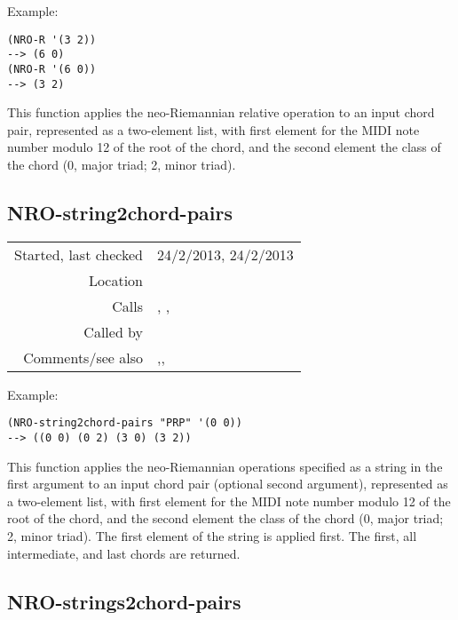 \vspace{0.5cm}
\noindent Example:
\begin{verbatim}
(NRO-R '(3 2))
--> (6 0)
(NRO-R '(6 0))
--> (3 2)
\end{verbatim}

\noindent This function applies the neo-Riemannian
relative operation to an input chord pair, represented
as a two-element list, with first element for the MIDI
note number modulo 12 of the root of the chord, and
the second element the class of the chord (0, major
triad; 2, minor triad).


\subsection*{NRO-string2chord-pairs}\label{fun:NRO-string2chord-pairs}

\vspace{0.3cm}
\begin{tabular}{r|p{8cm}}
Started, last checked & 24/2/2013, 24/2/2013 \\
Location & \nameref{sec:NRO} \\
Calls & \nameref{fun:NRO-L}, \nameref{fun:NRO-P}, \nameref{fun:NRO-R} \\
Called by & \nameref{fun:NRO-strings2chord-pairs} \\
Comments/see also & \nameref{fun:chord-pair2NRO-string},\newline \nameref{fun:chord-pairs2NRO-strings},\newline \nameref{fun:NRO-strings2chord-pairs}
\end{tabular}

\vspace{0.5cm}
\noindent Example:
\begin{verbatim}
(NRO-string2chord-pairs "PRP" '(0 0))
--> ((0 0) (0 2) (3 0) (3 2))
\end{verbatim}

\noindent This function applies the neo-Riemannian
operations specified as a string in the first argument
to an input chord pair (optional second argument),
represented as a two-element list, with first element
for the MIDI note number modulo 12 of the root of the
chord, and the second element the class of the chord
(0, major triad; 2, minor triad). The first element of
the string is applied first. The first, all
intermediate, and last chords are returned.


\subsection*{NRO-strings2chord-pairs}\label{fun:NRO-strings2chord-pairs}

